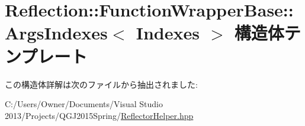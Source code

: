 \hypertarget{struct_reflection_1_1_function_wrapper_base_1_1_args_indexes}{}\section{Reflection\+:\+:Function\+Wrapper\+Base\+:\+:Args\+Indexes$<$ Indexes $>$ 構造体テンプレート}
\label{struct_reflection_1_1_function_wrapper_base_1_1_args_indexes}


この構造体詳解は次のファイルから抽出されました\+:\begin{DoxyCompactItemize}
\item 
C\+:/\+Users/\+Owner/\+Documents/\+Visual Studio 2013/\+Projects/\+Q\+G\+J2015\+Spring/\hyperlink{_reflector_helper_8hpp}{Reflector\+Helper.\+hpp}\end{DoxyCompactItemize}
